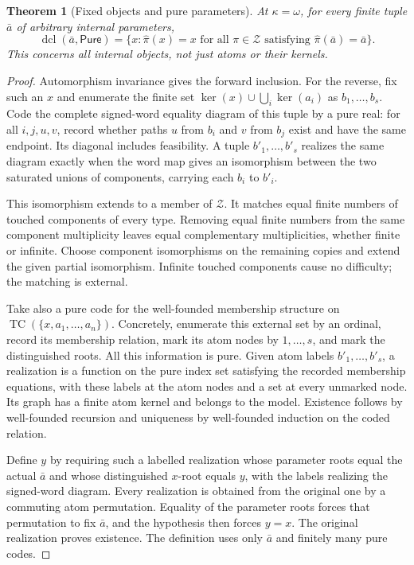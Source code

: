 \documentclass[11pt,letterpaper]{article}
\numberwithin{equation}{section}
\theoremstyle{plain}
\newtheorem{theorem}{Theorem}[section]
\theoremstyle{definition}
\theoremstyle{remark}
\newcommand{\kerat}{\operatorname{ker}}
\newcommand{\TC}{\operatorname{TC}}
\newcommand{\dcl}{\operatorname{dcl}}
\newcommand{\Pure}{\mathsf{Pure}}
\newcommand{\srcs}[1]{\par\noindent{\footnotesize\textit{Sources:} #1}\par}
\begin{document}
\begin{theorem}[Fixed objects and pure parameters]\label{nee:aa:thm:fixedobjects}
At $\kappa=\omega$, for every finite tuple $\bar a$ of arbitrary internal
parameters,
\[
\dcl(\bar a,\Pure)
=\{x:\widehat\pi(x)=x\text{ for all }\pi\in\mathcal Z
\text{ satisfying }\widehat\pi(\bar a)=\bar a\}.
\]
This concerns all internal objects, not just atoms or their kernels.
\end{theorem}
\srcs{source~03, Theorem~4.5.}
\begin{proof}
Automorphism invariance gives the forward inclusion. For the reverse, fix such
an $x$ and enumerate the finite set
$\kerat(x)\cup\bigcup_i\kerat(a_i)$ as $b_1,\ldots,b_s$.
Code the complete signed-word equality diagram of this tuple by a pure real:
for all $i,j,u,v$, record whether paths $u$ from $b_i$ and $v$ from $b_j$
exist and have the same endpoint. Its diagonal includes feasibility. A tuple
$b'_1,\ldots,b'_s$ realizes the same diagram exactly when the word map gives
an isomorphism between the two saturated unions of components, carrying each
$b_i$ to $b'_i$.

This isomorphism extends to a member of $\mathcal Z$. It matches equal finite
numbers of touched components of every type. Removing equal finite numbers
from the same component multiplicity leaves equal complementary multiplicities,
whether finite or infinite. Choose component isomorphisms on the remaining
copies and extend the given partial isomorphism. Infinite touched components
cause no difficulty; the matching is external.

Take also a pure code for the well-founded membership structure on
$\TC(\{x,a_1,\ldots,a_n\})$. Concretely, enumerate this external set by an
ordinal, record its membership relation, mark its atom nodes by
$1,\ldots,s$, and mark the distinguished roots. All this information is pure.
Given atom labels $b'_1,\ldots,b'_s$, a realization is a function on the pure
index set satisfying the recorded membership equations, with these labels at
the atom nodes and a set at every unmarked node. Its graph has a finite atom
kernel and belongs to the model.
Existence follows by well-founded recursion and uniqueness by well-founded
induction on the coded relation.

Define $y$ by requiring such a labelled realization whose parameter roots equal
the actual $\bar a$ and whose distinguished $x$-root equals $y$, with the labels
realizing the signed-word diagram. Every realization is obtained from the
original one by a commuting atom permutation. Equality of the parameter roots
forces that permutation to fix $\bar a$, and the hypothesis then forces
$y=x$. The original realization proves existence. The definition uses only
$\bar a$ and finitely many pure codes.
\end{proof}
\end{document}
